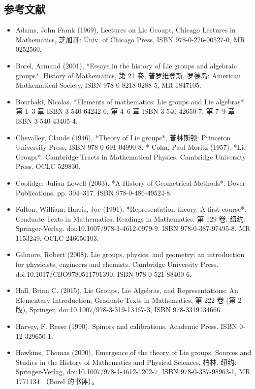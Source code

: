 \subsection{参考文献}
\begin{itemize}
\item Adams, John Frank (1969), Lectures on Lie Groups, Chicago Lectures in Mathematics, 芝加哥: Univ. of Chicago Press, ISBN 978-0-226-00527-0, MR 0252560.
\item Borel, Armand (2001), *Essays in the history of Lie groups and algebraic groups*, History of Mathematics, 第 21 卷, 普罗维登斯, 罗德岛: American Mathematical Society, ISBN 978-0-8218-0288-5, MR 1847105.
\item Bourbaki, Nicolas, *Elements of mathematics: Lie groups and Lie algebras*. 第 1–3 章 ISBN 3-540-64242-0, 第 4–6 章 ISBN 3-540-42650-7, 第 7–9 章 ISBN 3-540-43405-4.
\item Chevalley, Claude (1946), *Theory of Lie groups*, 普林斯顿: Princeton University Press, ISBN 978-0-691-04990-8.
* Cohn, Paul Moritz (1957). *Lie Groups*. Cambridge Tracts in Mathematical Physics. Cambridge University Press. OCLC 529830.
\item Coolidge, Julian Lowell (2003). *A History of Geometrical Methods*. Dover Publications. pp. 304–317. ISBN 978-0-486-49524-8.
\item Fulton, William; Harris, Joe (1991). *Representation theory. A first course*. Graduate Texts in Mathematics, Readings in Mathematics. 第 129 卷. 纽约: Springer-Verlag. doi:10.1007/978-1-4612-0979-9. ISBN 978-0-387-97495-8. MR 1153249. OCLC 246650103.
\item Gilmore, Robert (2008). Lie groups, physics, and geometry: an introduction for physicists, engineers and chemists. Cambridge University Press. doi:10.1017/CBO9780511791390. ISBN 978-0-521-88400-6.
\item Hall, Brian C. (2015), Lie Groups, Lie Algebras, and Representations: An Elementary Introduction, Graduate Texts in Mathematics, 第 222 卷 (第 2 版), Springer, doi:10.1007/978-3-319-13467-3, ISBN 978-3319134666.
\item Harvey, F. Reese (1990). Spinors and calibrations. Academic Press. ISBN 0-12-329650-1.
\item Hawkins, Thomas (2000), Emergence of the theory of Lie groups, Sources and Studies in the History of Mathematics and Physical Sciences, 柏林, 纽约: Springer-Verlag, doi:10.1007/978-1-4612-1202-7, ISBN 978-0-387-98963-1, MR 1771134 （Borel 的书评）。

\end{itemize}